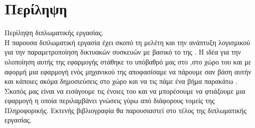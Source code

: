 \chapter*{Περίληψη}

Περίληψη διπλωματικής εργασίας.\\

\noindent H παρουσα διπλωματική εργασία έχει σκοπό τη μελέτη και την ανάπτυξη λογισμικού
για την παραμετροποίηση δικτυακών συσκευών με βασικό  το  της .
Η ιδέα για την υλοποίηση αυτής της εφαρμογής στάθηκε το υπόβαθρό μας στο 
,στο χώρο του  και με αφορμή μια εφαρμογή ενός μηχανικού της  αποφασίσαμε να πάρουμε σαν βάση
αυτήν και κάποιες ακόμα δημοσιεύσεις στο χώρο και να τις πάμε ένα βήμα παρακάτω
. Σκοπός μας είναι να εισάγουμε τις ένοιες του    
και να μπορέσουμε να φτιάξουμε μια εφαρμογή η οποία περιλαμβάνει γνώσεις γύρω από διάφορους τομείς της Πληροφορικής.
Εκτενής βιβλιογραφία θα παρουσιαστεί στο τέλος της διπλωματικής εργασίας.

